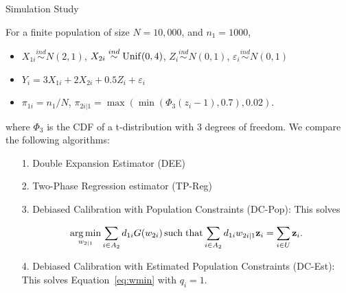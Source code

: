 \documentclass[final]{beamer}
\DeclareMathOperator*{\argmin}{arg\,min}
\DeclareMathOperator*{\suchthat}{such\; that}
\newlength{\colwidth}
\begin{document}
\begin{frame}[t]
\begin{columns}[t]
\begin{column}{\colwidth}
  \begin{block}{Simulation Study}

  For a finite population of size $N = 10,000$, and $n_1 = 1000$,

  \begin{itemize}
    \item $X_{1i} \stackrel{ind}{\sim} N(2, 1)$,
      $X_{2i} \stackrel{ind}{\sim} \rm{Unif}(0, 4)$,
      $Z_{i} \stackrel{ind}{\sim} N(0, 1)$,
      $\varepsilon_i \stackrel{ind}{\sim} N(0, 1)$
    \item $Y_{i} = 3 X_{1i} + 2 X_{2i} + 0.5 Z_i + \varepsilon_i$
    \item $\pi_{1i} = n_1 / N$,
      $\pi_{2i|1} = \max(\min(\Phi_3(z_{i} - 1), 0.7), 0.02)$.
  \end{itemize}

  where $\Phi_3$ is the CDF of a t-distribution with 3 degrees of freedom. We
  compare the following algorithms:

  \begin{itemize}
    \item[1.] Double Expansion Estimator (DEE)
    \item[2.] Two-Phase Regression estimator (TP-Reg)
    \item[3.] Debiased Calibration with Population Constraints (DC-Pop): This 
      solves 

    \begin{equation*}
      \argmin_{w_{2|1}} \sum_{i \in A_2} d_{1i} G(w_{2i}) \suchthat
      \sum_{i \in A_2} d_{1i} w_{2i|1} {\bf z}_i = \sum_{i \in U} {\bf z}_i.
    \end{equation*}

    \item[4.] Debiased Calibration with Estimated Population Constraints (DC-Est):
      This solves Equation~\eqref{eq:wmin} with $q_i = 1$.
  \end{itemize}

  \begin{table}[ht!]
    \centering
  
  \caption{This table shows the results of the simulation study. It displays the
  Bias, RMSE, empirical 95\% confidence interval, and a t-statistic assessing the
  unbiasedness of each estimator for the estimators: DEE, TP-Reg, DC-Pop, and
  DC-Est.}
  \label{tab:tpdc-mean}
  \end{table}
  \end{block}


\end{column}
\end{columns}
\end{frame}
\end{document}

